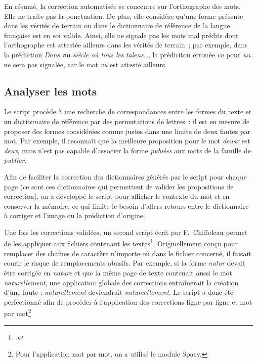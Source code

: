 \documentclass[a4paper,12pt,twoside]{book}
\begin{document}
				En résumé, la correction automatisée se concentre sur l'orthographe des mots. Elle ne traite pas la ponctuation. De plus, elle considère qu'une forme présente dans les vérités de terrain ou dans le dictionnaire de référence de la langue française est en soi valide. Ainsi, elle ne signale pas les mots mal prédits dont l'orthographe est attestée ailleurs dans les vérités de terrain~; par exemple, dans la prédiction \textit{Dans \textbf{vu} siècle où tous les talens…}, la prédiciton erronée \textit{vu} pour \textit{un} ne sera pas signalée, car le mot \textit{vu} est attesté ailleurs.
					
			\subsection{Analyser les mots}
				Le script procède à une recherche de correspondances entre les formes du texte et un dictionnaire de référence par des permutations de lettres~: il est en mesure de proposer des formes considérées comme justes dans une limite de deux fautes par mot. Par exemple, il reconnaît que la meilleure proposition pour le mot \textit{deusx} est \textit{deux}, mais n'est pas capable d'associer la forme \textit{pubièes} aux mots de la famille de \textit{publier}.
						
				Afin de faciliter la correction des dictionnaires générés par le script pour chaque page (ce sont ces dictionnaires qui permettent de valider les propositions de correction), on a développé le script pour afficher le contexte du mot et en conserver la mémoire, ce qui limite le besoin d'allers-retours entre le dictionnaire à corriger et l'image ou la prédiction d'origine.
				
				Une fois les corrections validées, un second script écrit par F.~Chiffoleau permet de les appliquer aux fichiers contenant les textes\footcite{biayTextCorrectionPy2022}. Originellement conçu pour remplacer des chaînes de caractère n'importe où dans le fichier concerné, il faisait courir le risque de remplacements abusifs. Par exemple, si la forme \textit{natur} devait être corrigée en \textit{nature} et que la même page de texte contenait aussi le mot \textit{naturellement}, une application globale des corrections entraînerait la création d'une faute : \textit{naturellement} deviendrait \textit{natureellement}. Le script a donc été perfectionné afin de procéder à l'application des corrections ligne par ligne et mot par mot\footnote{Pour l'application mot par mot, on a utilisé le module Spacy\cite{SpaCyIndustrialstrengthNatural}.}
				
\end{document}

